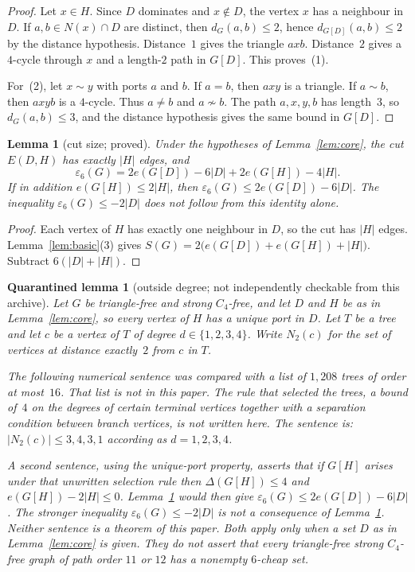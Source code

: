 \documentclass[11pt]{amsart}
\newtheorem{lemma}[theorem]{Lemma}
\newtheorem{qlemma}[theorem]{Quarantined lemma}
\theoremstyle{definition}
\theoremstyle{remark}
\begin{document}
\begin{proof}
Let $x\in H$. Since $D$ dominates and $x\notin D$, the vertex $x$ has a neighbour in $D$. If $a,b\in N(x)\cap D$ are distinct, then $d_G(a,b)\le 2$, hence $d_{G[D]}(a,b)\le 2$ by the distance hypothesis. Distance~$1$ gives the triangle $axb$. Distance~$2$ gives a $4$-cycle through $x$ and a length-$2$ path in $G[D]$. This proves~(1).

For~(2), let $x\sim y$ with ports $a$ and $b$. If $a=b$, then $axy$ is a triangle. If $a\sim b$, then $axyb$ is a $4$-cycle. Thus $a\ne b$ and $a\not\sim b$. The path $a,x,y,b$ has length~$3$, so $d_G(a,b)\le 3$, and the distance hypothesis gives the same bound in $G[D]$.
\end{proof}

\begin{lemma}[cut size; proved]\label{lem:coreid}
Under the hypotheses of Lemma~\ref{lem:core}, the cut $E(D,H)$ has exactly $|H|$ edges, and
\[
\varepsilon_6(G)=2e(G[D])-6|D|+2e(G[H])-4|H|.
\]
If in addition $e(G[H])\le 2|H|$, then $\varepsilon_6(G)\le 2e(G[D])-6|D|$. The inequality $\varepsilon_6(G)\le -2|D|$ does not follow from this identity alone.
\end{lemma}

\begin{proof}
Each vertex of $H$ has exactly one neighbour in $D$, so the cut has $|H|$ edges. Lemma~\ref{lem:basic}(3) gives $S(G)=2\bigl(e(G[D])+e(G[H])+|H|\bigr)$. Subtract $6(|D|+|H|)$.
\end{proof}

\begin{qlemma}[outside degree; not independently checkable from this archive]\label{lem:coredeg}
Let $G$ be triangle-free and strong $C_4$-free, and let $D$ and $H$ be as in Lemma~\ref{lem:core}, so every vertex of $H$ has a unique port in $D$. Let $T$ be a tree and let $c$ be a vertex of $T$ of degree $d\in\{1,2,3,4\}$. Write $N_2(c)$ for the set of vertices at distance exactly~$2$ from $c$ in $T$.

The following numerical sentence was compared with a list of $1{,}208$ trees of order at most~$16$. That list is not in this paper. The rule that selected the trees, a bound of~$4$ on the degrees of certain terminal vertices together with a separation condition between branch vertices, is not written here. The sentence is: $|N_2(c)|\le 3,4,3,1$ according as $d=1,2,3,4$.

A second sentence, using the unique-port property, asserts that if $G[H]$ arises under that unwritten selection rule then $\Delta(G[H])\le 4$ and $e(G[H])-2|H|\le 0$. Lemma~\ref{lem:coreid} would then give $\varepsilon_6(G)\le 2e(G[D])-6|D|$. The stronger inequality $\varepsilon_6(G)\le -2|D|$ is not a consequence of Lemma~\ref{lem:coreid}. Neither sentence is a theorem of this paper. Both apply only when a set $D$ as in Lemma~\ref{lem:core} is given. They do not assert that every triangle-free strong $C_4$-free graph of path order $11$ or $12$ has a nonempty $6$-cheap set.
\end{qlemma}
\end{document}
